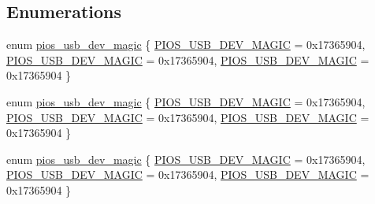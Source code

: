 \subsection*{Enumerations}
\begin{DoxyCompactItemize}
\item 
enum \hyperlink{group___p_i_o_s___u_s_b_ga388809c6af586364da35c0e34ddd2a53}{pios\-\_\-usb\-\_\-dev\-\_\-magic} \{ \hyperlink{group___p_i_o_s___u_s_b_gga388809c6af586364da35c0e34ddd2a53a3bb26b80e8ca1ed00d112f1dd1fe7fa4}{P\-I\-O\-S\-\_\-\-U\-S\-B\-\_\-\-D\-E\-V\-\_\-\-M\-A\-G\-I\-C} = 0x17365904, 
\hyperlink{group___p_i_o_s___u_s_b_gga388809c6af586364da35c0e34ddd2a53a3bb26b80e8ca1ed00d112f1dd1fe7fa4}{P\-I\-O\-S\-\_\-\-U\-S\-B\-\_\-\-D\-E\-V\-\_\-\-M\-A\-G\-I\-C} = 0x17365904, 
\hyperlink{group___p_i_o_s___u_s_b_gga388809c6af586364da35c0e34ddd2a53a3bb26b80e8ca1ed00d112f1dd1fe7fa4}{P\-I\-O\-S\-\_\-\-U\-S\-B\-\_\-\-D\-E\-V\-\_\-\-M\-A\-G\-I\-C} = 0x17365904
 \}
\item 
enum \hyperlink{group___p_i_o_s___u_s_b_ga388809c6af586364da35c0e34ddd2a53}{pios\-\_\-usb\-\_\-dev\-\_\-magic} \{ \hyperlink{group___p_i_o_s___u_s_b_gga388809c6af586364da35c0e34ddd2a53a3bb26b80e8ca1ed00d112f1dd1fe7fa4}{P\-I\-O\-S\-\_\-\-U\-S\-B\-\_\-\-D\-E\-V\-\_\-\-M\-A\-G\-I\-C} = 0x17365904, 
\hyperlink{group___p_i_o_s___u_s_b_gga388809c6af586364da35c0e34ddd2a53a3bb26b80e8ca1ed00d112f1dd1fe7fa4}{P\-I\-O\-S\-\_\-\-U\-S\-B\-\_\-\-D\-E\-V\-\_\-\-M\-A\-G\-I\-C} = 0x17365904, 
\hyperlink{group___p_i_o_s___u_s_b_gga388809c6af586364da35c0e34ddd2a53a3bb26b80e8ca1ed00d112f1dd1fe7fa4}{P\-I\-O\-S\-\_\-\-U\-S\-B\-\_\-\-D\-E\-V\-\_\-\-M\-A\-G\-I\-C} = 0x17365904
 \}
\item 
enum \hyperlink{group___p_i_o_s___u_s_b_ga388809c6af586364da35c0e34ddd2a53}{pios\-\_\-usb\-\_\-dev\-\_\-magic} \{ \hyperlink{group___p_i_o_s___u_s_b_gga388809c6af586364da35c0e34ddd2a53a3bb26b80e8ca1ed00d112f1dd1fe7fa4}{P\-I\-O\-S\-\_\-\-U\-S\-B\-\_\-\-D\-E\-V\-\_\-\-M\-A\-G\-I\-C} = 0x17365904, 
\hyperlink{group___p_i_o_s___u_s_b_gga388809c6af586364da35c0e34ddd2a53a3bb26b80e8ca1ed00d112f1dd1fe7fa4}{P\-I\-O\-S\-\_\-\-U\-S\-B\-\_\-\-D\-E\-V\-\_\-\-M\-A\-G\-I\-C} = 0x17365904, 
\hyperlink{group___p_i_o_s___u_s_b_gga388809c6af586364da35c0e34ddd2a53a3bb26b80e8ca1ed00d112f1dd1fe7fa4}{P\-I\-O\-S\-\_\-\-U\-S\-B\-\_\-\-D\-E\-V\-\_\-\-M\-A\-G\-I\-C} = 0x17365904
 \}
\end{DoxyCompactItemize}
